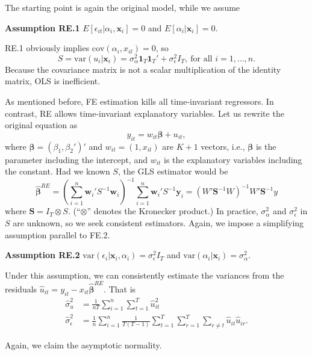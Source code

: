 \documentclass[11pt]{article}
\begin{document}
The starting point is again the original model, while we assume

\textbf{Assumption RE.1}
\(E\left[\epsilon_{it}|\alpha_{i},\mathbf{x}_{i}\right]=0\) and
\(E\left[\alpha_{i}|\mathbf{x}_{i}\right]=0\).

RE.1 obviously implies \(\mathrm{cov}\left(\alpha_{i},x_{it}\right)=0\),
so
\[S=\mathrm{var}\left(u_{i}|\mathbf{x}_{i}\right)=\sigma_{\alpha}^{2}\mathbf{1}_{T}\mathbf{1}_{T}'+\sigma_{\epsilon}^{2}I_{T},\ \mbox{for all }i=1,\ldots,n.\]
Because the covariance matrix is not a scalar multiplication of the
identity matrix, OLS is inefficient.

    As mentioned before, FE estimation kills all time-invariant regressors.
In contrast, RE allows time-invariant explanatory variables. Let us
rewrite the original equation as
\[y_{it}=w_{it}\boldsymbol{\beta}+u_{it},\] where
\(\boldsymbol{\beta}=\left(\beta_{1},\beta_{2}'\right)'\) and
\(w_{it}=\left(1,x_{it}\right)\) are \(K+1\) vectors, i.e.,
\(\boldsymbol{\beta}\) is the parameter including the intercept, and
\(w_{it}\) is the explanatory variables including the constant. Had we
known \(S\), the GLS estimator would be
\[\widehat{\boldsymbol{\beta}}^{RE}=\left(\sum_{i=1}^{n}\mathbf{w}_{i}'S^{-1}\mathbf{w}_{i}\right)^{-1}\sum_{i=1}^{n}\mathbf{w}_{i}'S^{-1}\mathbf{y}_{i}=\left(W'\mathbf{S}^{-1}W\right)^{-1}W'\mathbf{S}^{-1}y\]
where \(\mathbf{S}=I_{T}\otimes S\). (``\(\otimes\)'' denotes the
Kronecker product.) In practice, \(\sigma_{\alpha}^{2}\) and
\(\sigma_{\epsilon}^{2}\) in \(S\) are unknown, so we seek consistent
estimators. Again, we impose a simplifying assumption parallel to FE.2.

    \textbf{Assumption RE.2}
\(\mathrm{var}\left(\epsilon_{i}|\mathbf{x}_{i},\alpha_{i}\right)=\sigma_{\epsilon}^{2}I_{T}\)
and
\(\mathrm{var}\left(\alpha_{i}|\mathbf{x}_{i}\right)=\sigma_{\alpha}^{2}.\)

Under this assumption, we can consistently estimate the variances from
the residuals
\(\widehat{u}_{it}=y_{it}-x_{it}\widehat{\boldsymbol{\beta}}^{RE}\).
That is \[\begin{aligned}
\widehat{\sigma}_{u}^{2} & =  \frac{1}{nT}\sum_{i=1}^{n}\sum_{t=1}^{T}\widehat{u}_{it}^{2}\\
\widehat{\sigma}_{\epsilon}^{2} & =  \frac{1}{n}\sum_{i=1}^{n}\frac{1}{T\left(T-1\right)}\sum_{t=1}^{T}\sum_{r=1}^{T}\sum_{r\neq t}\widehat{u}_{it}\widehat{u}_{ir}.
\end{aligned}\]

Again, we claim the asymptotic normality.
\end{document}
